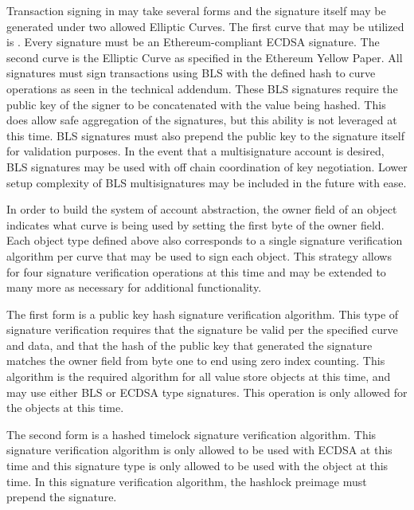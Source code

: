 Transaction signing in \LayerTwoLong{} may take several forms and the
signature itself may be generated under two allowed Elliptic Curves.
The first curve that may be utilized is \secp{}.
Every \secp{} signature must be an Ethereum-compliant ECDSA signature.
The second curve is the \bnEth{} Elliptic Curve as specified in the
Ethereum Yellow Paper.
All \bnEth{} signatures must sign transactions using BLS with the defined
hash to curve operations as seen in the technical addendum.
These BLS signatures require the public key of the signer to be
concatenated with the value being hashed.
This does allow safe aggregation of the signatures, but this ability is
not leveraged at this time.
BLS signatures must also prepend the public key to the signature itself
for validation purposes.
In the event that a multisignature account is desired, BLS signatures
may be used with off chain coordination of key negotiation.
Lower setup complexity of BLS multisignatures may be included in the
future with ease.

In order to build the system of account abstraction, the owner field of
an object indicates what curve is being used by setting the first byte
of the owner field.
Each object type defined above also corresponds to a single signature
verification algorithm per curve that may be used to sign each object.
This strategy allows for four signature verification operations at this
time and may be extended to many more as necessary for additional
functionality.

The first form is a public key hash signature verification algorithm.
This type of signature verification requires that the signature be
valid per the specified curve and data, and that the hash of the public
key that generated the signature matches the owner field from byte one
to end using zero index counting.
This algorithm is the required algorithm for all value store objects at
this time, and may use either BLS or ECDSA type signatures.
This operation is only allowed for the \ValueStore{} objects at this time.

The second form is a hashed timelock signature verification algorithm.
This signature verification algorithm is only allowed to be used with
ECDSA at this time and this signature type is only allowed to be used
with the \AtomicSwap{} object at this time.
In this signature verification algorithm, the hashlock preimage must
prepend the signature.

